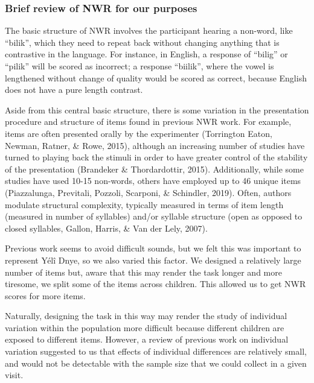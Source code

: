 \documentclass[english,,man,floatsintext]{apa6}
\begin{document}
\hypertarget{brief-review-of-nwr-for-our-purposes}{%
\subsubsection{Brief review of NWR for our purposes}\label{brief-review-of-nwr-for-our-purposes}}

The basic structure of NWR involves the participant hearing a non-word, like ``bilik'', which they need to repeat back without changing anything that is contrastive in the language. For instance, in English, a response of ``bilig'' or ``pilik'' will be scored as incorrect; a response ``biilik'', where the vowel is lengthened without change of quality would be scored as correct, because English does not have a pure length contrast.

Aside from this central basic structure, there is some variation in the presentation procedure and structure of items found in previous NWR work. For example, items are often presented orally by the experimenter (Torrington Eaton, Newman, Ratner, \& Rowe, 2015), although an increasing number of studies have turned to playing back the stimuli in order to have greater control of the stability of the presentation (Brandeker \& Thordardottir, 2015). Additionally, while some studies have used 10-15 non-words, others have employed up to 46 unique items (Piazzalunga, Previtali, Pozzoli, Scarponi, \& Schindler, 2019). Often, authors modulate structural complexity, typically measured in terms of item length (measured in number of syllables) and/or syllable structure (open as opposed to closed syllables, Gallon, Harris, \& Van der Lely, 2007).

Previous work seems to avoid difficult sounds, but we felt this was important to represent Yélî Dnye, so we also varied this factor. We designed a relatively large number of items but, aware that this may render the task longer and more tiresome, we split some of the items across children. This allowed us to get NWR scores for more items.

Naturally, designing the task in this way may render the study of individual variation within the population more difficult because different children are exposed to different items. However, a review of previous work on individual variation suggested to us that effects of individual differences are relatively small, and would not be detectable with the sample size that we could collect in a given visit.
\end{document}
